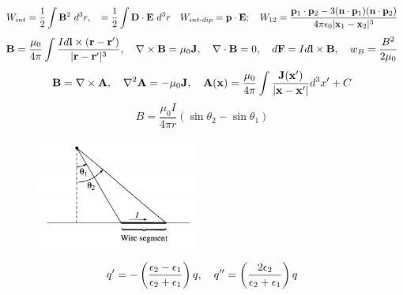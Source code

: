 \documentclass[9pt,letterpaper]{article}
\begin{document}
\[
	W_{int} = \frac{1}{2}\int \vect B^2\ d^3r,\quad = \frac{1}{2}\int \vect D\cdot\vect E\ d^3r
	\quad
	W_{int\text -dip} = \vect p\cdot\vect E;\quad W_{12} = 
	\frac{\vect p_1\cdot\vect p_2-3(\vect n\cdot \vect p_1)(\vect n\cdot\vect p_2)}{4\pi\epo|\vect x_1-\vect x_2|^3}
\]
\[
	\mathbf{B} = \frac{\mu_0}{4\pi}\int \frac{Id\mathbf{l}\times(\mathbf{r}-\mathbf{r}')}{|\mathbf{r}-\mathbf{r}'|^3},\quad
	\nabla\times \mathbf{B} = \mu_0\mathbf{J},\quad
	\nabla\cdot\mathbf{B} = 0,\quad
	d\mathbf{F} = Id\mathbf{l}\times\mathbf{B},\quad
	w_B = \frac{B^2}{2\mu_0}
\]
\[
	\mathbf{B} = \nabla\times\mathbf{A},\quad
	\nabla^2 \mathbf{A} = -\mu_0\mathbf{J},\quad
	\mathbf{A}(\mathbf{x}) = \frac{\mu_0}{4\pi}\int \frac{\mathbf{J}(\mathbf{x}')}{|\mathbf{x}-\mathbf{x}'|}d^3x'+C
\]
\[
	B = \frac{\mu_0 I}{4\pi r}(\sin\theta_2-\sin\theta_1)
\]
\begin{figure}
    \includegraphics[width=0.48\textwidth]{wire.png}
\end{figure}
\[
	q' = -\left(\frac{\epsilon_2-\epsilon_1}{\epsilon_2+\epsilon_1}\right)q,\quad 
	q'' = \left(\frac{2\epsilon_2}{\epsilon_2+\epsilon_1}\right)q
\]
	
	
	
	
	
	
	
\end{document}
